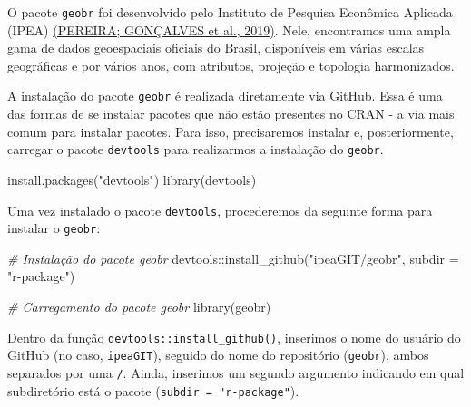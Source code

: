 \documentclass[
  brazilian,
]{book}
\newenvironment{Shaded}{\begin{snugshade}}{\end{snugshade}}
\newcommand{\AttributeTok}[1]{\textcolor[rgb]{0.77,0.63,0.00}{#1}}
\newcommand{\CommentTok}[1]{\textcolor[rgb]{0.56,0.35,0.01}{\textit{#1}}}
\newcommand{\FunctionTok}[1]{\textcolor[rgb]{0.00,0.00,0.00}{#1}}
\newcommand{\NormalTok}[1]{#1}
\newcommand{\SpecialCharTok}[1]{\textcolor[rgb]{0.00,0.00,0.00}{#1}}
\newcommand{\StringTok}[1]{\textcolor[rgb]{0.31,0.60,0.02}{#1}}
\begin{document}
O pacote \texttt{geobr} foi desenvolvido pelo Instituto de Pesquisa Econômica Aplicada (IPEA) \href{https://github.com/ipeaGIT/geobr}{(PEREIRA; GONÇALVES et al., 2019)}. Nele, encontramos uma ampla gama de dados geoespaciais oficiais do Brasil, disponíveis em várias escalas geográficas e por vários anos, com atributos, projeção e topologia harmonizados.

A instalação do pacote \texttt{geobr} é realizada diretamente via GitHub. Essa é uma das formas de se instalar pacotes que não estão presentes no CRAN - a via mais comum para instalar pacotes. Para isso, precisaremos instalar e, posteriormente, carregar o pacote \texttt{devtools} para realizarmos a instalação do \texttt{geobr}.

\begin{Shaded}
\begin{Highlighting}[]
\FunctionTok{install.packages}\NormalTok{(}\StringTok{"devtools"}\NormalTok{)}
\FunctionTok{library}\NormalTok{(devtools)}
\end{Highlighting}
\end{Shaded}

Uma vez instalado o pacote \texttt{devtools}, procederemos da seguinte forma para instalar o \texttt{geobr}:

\begin{Shaded}
\begin{Highlighting}[]
\CommentTok{\# Instalação do pacote \textasciigrave{}geobr\textasciigrave{}}
\NormalTok{devtools}\SpecialCharTok{::}\FunctionTok{install\_github}\NormalTok{(}\StringTok{"ipeaGIT/geobr"}\NormalTok{, }\AttributeTok{subdir =} \StringTok{"r{-}package"}\NormalTok{)}
\end{Highlighting}
\end{Shaded}

\begin{Shaded}
\begin{Highlighting}[]
\CommentTok{\# Carregamento do pacote \textasciigrave{}geobr\textasciigrave{}}
\FunctionTok{library}\NormalTok{(geobr)}
\end{Highlighting}
\end{Shaded}

Dentro da função \texttt{devtools::install\_github()}, inserimos o nome do usuário do GitHub (no caso, \texttt{ipeaGIT}), seguido do nome do repositório (\texttt{geobr}), ambos separados por uma \texttt{/}. Ainda, inserimos um segundo argumento indicando em qual subdiretório está o pacote (\texttt{subdir\ =\ "r-package"}).
\end{document}
